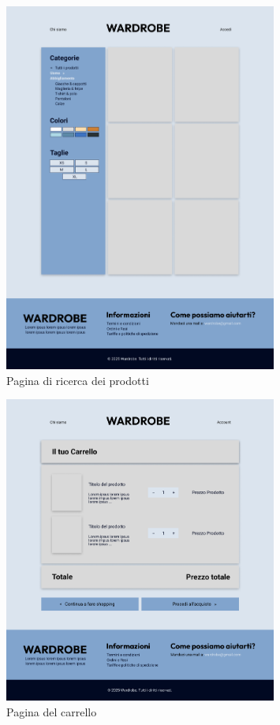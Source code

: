 \begin{figure}[h!]
\centering
\includegraphics[width=0.8\textwidth]{immagini/Mockups/ricerca.png}
\caption{Pagina di ricerca dei prodotti}
\end{figure}

\clearpage

\begin{figure}[h!]
\centering
\includegraphics[width=0.8\textwidth]{immagini/Mockups/carrello.png}
\caption{Pagina del carrello}
\end{figure}

